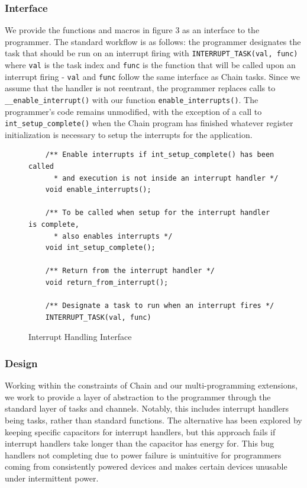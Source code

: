 \documentclass[11pt]{sensys-proc}
\newcommand{\chain}{Chain\xspace}
\begin{document}
\subsubsection{Interface}
We provide the functions and macros in figure 3 as an interface to
the programmer. The standard workflow is as follows: the programmer
designates the task that should be run on an interrupt firing
with \texttt{INTERRUPT\_TASK(val, func)} where \texttt{val} is the task
index and \texttt{func} is the function that will be called upon an
interrupt firing - \texttt{val} and \texttt{func} follow the same
interface as \chain tasks. Since we assume that the handler is not
reentrant, the programmer replaces calls to \texttt{\_\_enable\_interrupt()}
with our function \texttt{enable\_interrupts()}.
The programmer's code remains unmodified, with the exception of a call to
\texttt{int\_setup\_complete()} when the \chain program has finished whatever
register initialization is necessary to setup the interrupts for the
application.\\


\begin{figure}
\begin{minipage}[b]{1.0\textwidth}
\begin{lstlisting}
    /** Enable interrupts if int_setup_complete() has been called
      * and execution is not inside an interrupt handler */
    void enable_interrupts();

    /** To be called when setup for the interrupt handler is complete,
      * also enables interrupts */
    void int_setup_complete();

    /** Return from the interrupt handler */
    void return_from_interrupt();

    /** Designate a task to run when an interrupt fires */
    INTERRUPT_TASK(val, func)
\end{lstlisting}
\caption{Interrupt Handling Interface}\label{label-a}
\end{minipage}\hfill
\end{figure}

\subsubsection{Design}
Working within the constraints of \chain and our multi-programming extensions,
we work to provide a layer of abstraction to the programmer through the standard
layer of tasks and channels. Notably, this includes interrupt handlers being
tasks, rather than standard functions. The alternative has been explored
by keeping specific capacitors for interrupt handlers\cite{Aware}, but this
approach fails if interrupt handlers take longer than the capacitor has
energy for. This bug handlers not completing due to power failure is
unintuitive for programmers coming from consistently powered devices and
makes certain devices unusable under intermittent power.
\end{document}
